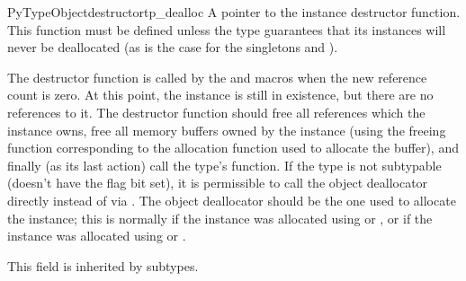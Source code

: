 \begin{cmemberdesc}{PyTypeObject}{destructor}{tp_dealloc}
  A pointer to the instance destructor function.  This function must
  be defined unless the type guarantees that its instances will never
  be deallocated (as is the case for the singletons  and
  ).

  The destructor function is called by the  and
   macros when the new reference count is
  zero.  At this point, the instance is still in existence, but there
  are no references to it.  The destructor function should free all
  references which the instance owns, free all memory buffers owned by
  the instance (using the freeing function corresponding to the
  allocation function used to allocate the buffer), and finally (as
  its last action) call the type's  function.  If the
  type is not subtypable (doesn't have the
   flag bit set), it is permissible to
  call the object deallocator directly instead of via
  .  The object deallocator should be the one used to
  allocate the instance; this is normally 
  if the instance was allocated using  or
  , or  if
  the instance was allocated using  or
  .

  This field is inherited by subtypes.
\end{cmemberdesc}

